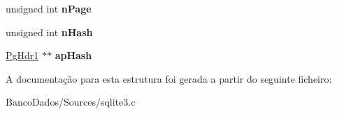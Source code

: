 \begin{DoxyCompactItemize}
\item 
\hypertarget{struct_p_cache1_ace332c276e28352992529f60f0ac457c}{unsigned int {\bfseries n\-Page}}\label{struct_p_cache1_ace332c276e28352992529f60f0ac457c}

\item 
\hypertarget{struct_p_cache1_a09d9488a8a3a52822e33dd43e14c69e1}{unsigned int {\bfseries n\-Hash}}\label{struct_p_cache1_a09d9488a8a3a52822e33dd43e14c69e1}

\item 
\hypertarget{struct_p_cache1_a1169ec7ba2a628d89841d16ced651e1f}{\hyperlink{struct_pg_hdr1}{Pg\-Hdr1} $\ast$$\ast$ {\bfseries ap\-Hash}}\label{struct_p_cache1_a1169ec7ba2a628d89841d16ced651e1f}

\end{DoxyCompactItemize}


A documentação para esta estrutura foi gerada a partir do seguinte ficheiro\-:\begin{DoxyCompactItemize}
\item 
Banco\-Dados/\-Sources/sqlite3.\-c\end{DoxyCompactItemize}

